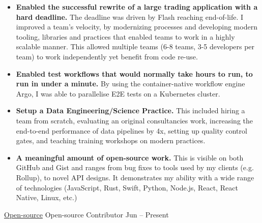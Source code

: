 \documentclass[10pt,a4paper]{article}
\begin{document}
\begin{indentsection}
\item
\begin{itemize}[leftmargin=0cm]

    \item \textbf{Enabled the successful rewrite of a large trading application with a hard deadline.} The deadline was driven by Flash reaching end-of-life. I improved a team's velocity, by modernizing processes and developing modern tooling, libraries and practices that enabled teams to work in a highly scalable manner. This allowed multiple teams (6-8 teams, 3-5 developers per team) to work independently yet benefit from code re-use.

    \item \textbf{Enabled test workflows that would normally take hours to run, to run in under a minute.} By using the container-native workflow engine Argo, I was able to parallelise E2E tests on a Kubernetes cluster.

    \item \textbf{Setup a Data Engineering/Science Practice.} This included hiring a team from scratch, evaluating an original consultancies work, increasing the end-to-end performance of data pipelines by 4x, setting up quality control gates, and teaching training workshops on modern practices.

    \item \textbf{A meaningful amount of open-source work.} This is visible on both GitHub and Gist and ranges from bug fixes to tools used by my clients (e.g. Rollup), to novel API designs. It demonstrates my ability with a wide range of technologies (JavaScript, Rust, Swift, Python, Node.js, React, React Native, Linux, etc.)

\end{itemize}
\end{indentsection}


\headedsection  %
  {\href{http://github.com/sebinsua}{Open-source}}
  {} {%
  \headedsubsection  %
    {Open-source Contributor}
    {Jun  -- Present}
    {}
}
\end{document}
